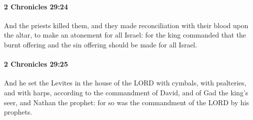 		\paragraph{2 Chronicles 29:24} %
			\label{2CHRONICLES-29-24}

			And the priests killed them, and they made reconciliation with their blood upon the altar, to make an atonement for all Israel: for the king commanded that the burnt offering and the sin offering should be made for all Israel.


		\paragraph{2 Chronicles 29:25} %
			\label{2CHRONICLES-29-25}

			And he set the Levites in the house of the LORD with cymbals, with psalteries, and with harps, according to the commandment of David, and of Gad the king's seer, and Nathan the prophet: for so was the commandment of the LORD by his prophets.

